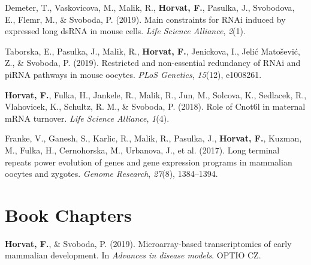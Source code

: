 \documentclass[11pt,a4paper,]{awesome-cv}
\begin{document}
\leavevmode{}%
Demeter, T., Vaskovicova, M., Malik, R., \textbf{Horvat, F.}, Pasulka,
J., Svobodova, E., Flemr, M., \& Svoboda, P. (2019). Main constraints
for RNAi induced by expressed long dsRNA in mouse cells. \emph{Life
Science Alliance}, \emph{2}(1).

\leavevmode{}%
Taborska, E., Pasulka, J., Malik, R., \textbf{Horvat, F.}, Jenickova,
I., Jelić Matošević, Z., \& Svoboda, P. (2019). Restricted and
non-essential redundancy of RNAi and piRNA pathways in mouse oocytes.
\emph{PLoS Genetics}, \emph{15}(12), e1008261.

\leavevmode{}%
\textbf{Horvat, F.}, Fulka, H., Jankele, R., Malik, R., Jun, M.,
Solcova, K., Sedlacek, R., Vlahovicek, K., Schultz, R. M., \& Svoboda,
P. (2018). Role of Cnot6l in maternal mRNA turnover. \emph{Life Science
Alliance}, \emph{1}(4).

\leavevmode{}%
Franke, V., Ganesh, S., Karlic, R., Malik, R., Pasulka, J.,
\textbf{Horvat, F.}, Kuzman, M., Fulka, H., Cernohorska, M., Urbanova,
J., et al. (2017). Long terminal repeats power evolution of genes and
gene expression programs in mammalian oocytes and zygotes. \emph{Genome
Research}, \emph{27}(8), 1384--1394.

\hypertarget{book-chapters}{%
\section{Book Chapters}\label{book-chapters}}

\hypertarget{bibliography}{}
\leavevmode{}%
\textbf{Horvat, F.}, \& Svoboda, P. (2019). Microarray-based
transcriptomics of early mammalian development. In \emph{Advances in
disease models}. OPTIO CZ.
\end{document}
